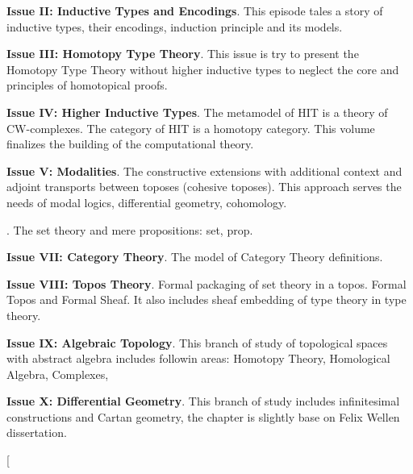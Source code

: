 \documentclass[twocolumn,10pt]{article}
\theoremstyle{definition}
\begin{document}
{\bf Issue II: Inductive Types and Encodings}.
This episode tales a story of inductive types, their encodings,
induction principle and its models.

{\bf Issue III: Homotopy Type Theory}.
This issue is try to present the Homotopy Type Theory without higher inductive types
to neglect the core and principles of homotopical proofs.

{\bf Issue IV: Higher Inductive Types}.
The metamodel of HIT is a theory of CW-complexes. The category of HIT is a homotopy category.
This volume finalizes the building of the computational theory.

{\bf Issue V: Modalities}. The constructive extensions with additional context and
adjoint transports between toposes (cohesive toposes). This approach serves the needs
of modal logics, differential geometry, cohomology.




.
The set theory and mere propositions: set, prop.

{\bf Issue VII: Category Theory}.
The model of Category Theory definitions.

{\bf Issue VIII: Topos Theory}.
Formal packaging of set theory in a topos. Formal Topos and Formal Sheaf.
It also includes sheaf embedding of type theory in type theory.

{\bf Issue IX: Algebraic Topology}. This branch of study of topological spaces with abstract algebra
includes followin areas: Homotopy Theory, Homological Algebra, Complexes,

{\bf Issue X: Differential Geometry}. This branch of study includes
infinitesimal constructions and Cartan geometry, the chapter is
slightly base on Felix Wellen dissertation.

\twocolumn[
\end{document}
